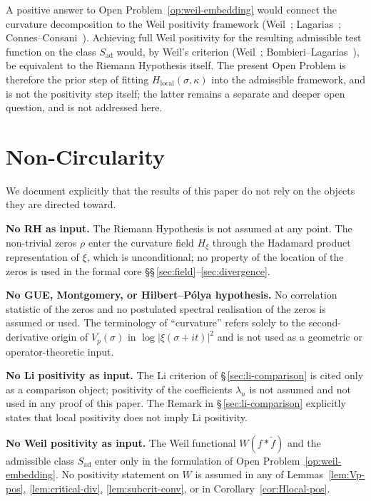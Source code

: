 \documentclass[11pt]{article}
\newcommand{\Hxi}{H_{\xi}}
\newcommand{\Hlocal}{H_{\mathrm{local}}}
\newcommand{\Sad}{S_{\mathrm{ad}}}
\begin{document}
A positive answer to Open Problem~\ref{op:weil-embedding}
would connect the curvature decomposition to the Weil
positivity framework
(Weil~\cite{Weil1952}; Lagarias~\cite{Lagarias};
Connes--Consani~\cite{ConnesConsani}).
Achieving full Weil positivity for the resulting admissible
test function on the class $\Sad$ would, by Weil's criterion
(Weil~\cite{Weil1952}; Bombieri--Lagarias~\cite{BombieriLagarias}),
be equivalent to the Riemann Hypothesis itself.
The present Open Problem is therefore the prior step of
fitting $\Hlocal(\sigma,\kappa)$ into the admissible
framework, and is not the positivity step itself; the latter
remains a separate and deeper open question, and is not
addressed here.

\section{Non-Circularity}
\label{sec:nocirc}

We document explicitly that the results of this paper do not
rely on the objects they are directed toward.

\textbf{No RH as input.}
The Riemann Hypothesis is not assumed at any point.
The non-trivial zeros $\rho$ enter the curvature field $\Hxi$
through the Hadamard product representation of $\xi$, which
is unconditional; no property of the location of the zeros is
used in the formal core
\S\S\,\ref{sec:field}--\ref{sec:divergence}.

\textbf{No GUE, Montgomery, or Hilbert--P\'olya hypothesis.}
No correlation statistic of the zeros and no postulated
spectral realisation of the zeros is assumed or used.
The terminology of ``curvature'' refers solely to the
second-derivative origin of $V_p(\sigma)$ in
$\log\lvert\xi(\sigma+it)\rvert^{2}$ and is not used as a
geometric or operator-theoretic input.

\textbf{No Li positivity as input.}
The Li criterion of \S\,\ref{sec:li-comparison} is cited only
as a comparison object; positivity of the coefficients
$\lambda_n$ is not assumed and not used in any proof of this
paper.
The Remark in \S\,\ref{sec:li-comparison} explicitly states
that local positivity does not imply Li positivity.

\textbf{No Weil positivity as input.}
The Weil functional $W(f*\check f)$ and the admissible class
$\Sad$ enter only in the formulation of
Open Problem~\ref{op:weil-embedding}.
No positivity statement on $W$ is assumed in any of
Lemmas~\ref{lem:Vp-pos}, \ref{lem:critical-div},
\ref{lem:subcrit-conv}, or in
Corollary~\ref{cor:Hlocal-pos}.
\end{document}
